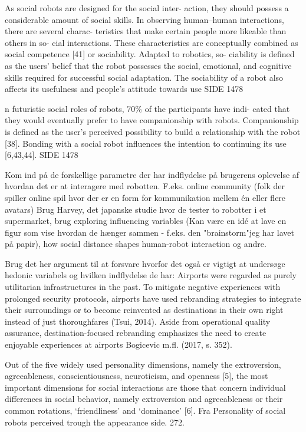 As social robots are designed for the social inter- action, they should possess a considerable amount of social skills. In observing human–human interactions, there are several charac- teristics that make certain people more likeable than others in so- cial interactions. These characteristics are conceptually combined as social competence [41] or sociability. Adapted to robotics, so- ciability is defined as the users’ belief that the robot possesses the social, emotional, and cognitive skills required for successful social adaptation. The sociability of a robot also affects its usefulness and people’s attitude towards use SIDE 1478

n futuristic social roles of robots, 70\% of the participants have indi- cated that they would eventually prefer to have companionship with robots. Companionship is defined as the user’s perceived possibility to build a relationship with the robot [38]. Bonding with a social robot influences the intention to continuing its use [6,43,44]. SIDE 1478


Kom ind på de forskellige parametre der har indflydelse på brugerens oplevelse af hvordan det er at interagere med robotten. F.eks. online community (folk der spiller online spil hvor der er en form for kommunikation mellem én eller flere avatars)
Brug Harvey, det japanske studie hvor de tester to robotter i et supermarket, brug exploring influencing variables (Kan være en idé at lave en figur som vise hvordan de hænger sammen - f.eks. den "brainstorm"jeg har lavet på papir), how social distance shapes human-robot interaction og andre.

Brug det her argument til at forsvare hvorfor det også er vigtigt at undersøge hedonic variabels og hvilken indflydelse de har: Airports were regarded as purely utilitarian infrastructures in the past. To mitigate negative experiences with prolonged security protocols, airports have used rebranding strategies to integrate their surroundings or to become reinvented as destinations in their own right instead of just thoroughfares (Tsui, 2014). Aside from operational quality assurance, destination-focused rebranding emphasizes the need to create enjoyable experiences at airports Bogicevic m.fl. (2017, s. 352).


Out of the five widely used personality dimensions, namely the extroversion, agreeableness, conscientiousness, neuroticism, and openness [5], the most important dimensions for social interactions are those that concern individual differences in social behavior, namely extroversion and agreeableness or their common rotations, ‘friendliness’ and ‘dominance’ [6]. Fra Personality of social robots perceived trough the appearance side. 272.








